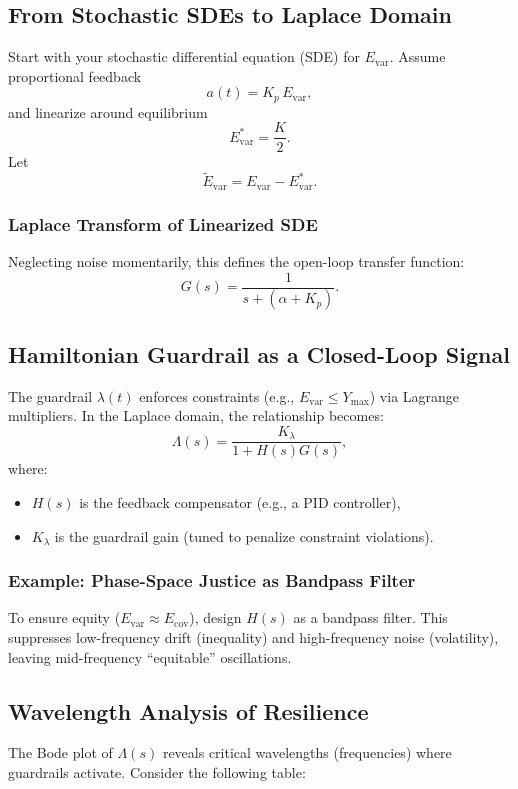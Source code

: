 \documentclass{article}
\theoremstyle{definition}
\begin{document}
\subsection{From Stochastic SDEs to Laplace Domain}
Start with your stochastic differential equation (SDE) for $E_{\text{var}}$. Assume proportional feedback
\[
a(t) = K_p\, E_{\text{var}},
\]
and linearize around equilibrium
\[
E_{\text{var}}^* = \frac{K}{2}.
\]
Let
\[
\widetilde{E}_{\text{var}} = E_{\text{var}} - E_{\text{var}}^*.
\]

\subsubsection{Laplace Transform of Linearized SDE}%
Neglecting noise momentarily, this defines the open-loop transfer function:
\[
G(s) = \frac{1}{s + (\alpha + K_p)}.
\]

\subsection{Hamiltonian Guardrail as a Closed-Loop Signal}
The guardrail $\lambda(t)$ enforces constraints (e.g., $E_{\text{var}} \le Y_{\text{max}}$) via Lagrange multipliers. In the Laplace domain, the relationship becomes:
\[
\Lambda(s) = \frac{K_\lambda}{1 + H(s)G(s)},
\]
where:
\begin{itemize}
    \item $H(s)$ is the feedback compensator (e.g., a PID controller),
    \item $K_\lambda$ is the guardrail gain (tuned to penalize constraint violations).
\end{itemize}

\subsubsection{Example: Phase-Space Justice as Bandpass Filter}
To ensure equity ($E_{\text{var}} \approx E_{\text{cov}}$), design $H(s)$ as a bandpass filter. This suppresses low-frequency drift (inequality) and high-frequency noise (volatility), leaving mid-frequency “equitable” oscillations.

\subsection{Wavelength Analysis of Resilience}
The Bode plot of $\Lambda(s)$ reveals critical wavelengths (frequencies) where guardrails activate. Consider the following table:
\end{document}
